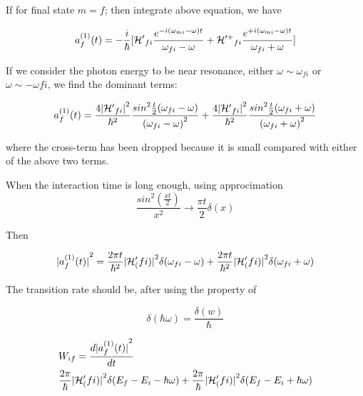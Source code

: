 If for final state $m=f$; then integrate above equation, we have

\begin{equation}
{a^{(1)}_{f}(t)}=-\frac{i}{\hbar}[{\mathcal{H}^\prime}_{fi}\frac{e^{-i(\omega_{mi}-\omega)t}}{\omega_{fi}-\omega}+{\mathcal{H}^{\prime+}}_{fi}\frac{e^{+i(\omega_{mi}-\omega)t}}{\omega_{fi}+\omega}]
\end{equation}

If we consider the photon energy to be near resonance, either $\omega\sim\omega_{fi}$ or $\omega\sim-\omega{fi}$, we find the dominant terms:

\begin{equation}
  {a^{(1)}_{f}(t)}=\frac{4{|{\mathcal{H}^\prime}_{fi}|}^2}{\hbar^2}\frac{{sin}^2\frac{t}{2}(\omega_{fi}-\omega)}{{(\omega_{fi}-\omega)}^2} +\frac{4{|{\mathcal{H}^\prime}_{fi}|}^2}{\hbar^2}\frac{{sin}^2\frac{t}{2}(\omega_{fi}+\omega)}{{(\omega_{fi}+\omega)}^2}
\end{equation}

where the cross-term has been dropped because it is small compared with either of the above two terms.

When the interaction time is long enough, using approcimation
\begin{equation}
  \frac{{sin}^2(\frac{xt}{2})}{x^2}\rightarrow \frac{\pi{t}}{2}\delta(x)
\end{equation}

Then

\begin{equation}
  {|a^{(1)}_f(t)|}^2= \frac{2\pi{t}}{\hbar^2}{|\mathcal{H}^\prime_(fi)|}^2\delta(\omega_{fi}-\omega)+\frac{2\pi{t}}{\hbar^2}{|\mathcal{H}^\prime_(fi)|}^2\delta(\omega_{fi}+\omega)
\end{equation}

The transition rate should be, after using the property of

\begin{equation}
  \delta(\hbar\omega)=\frac{\delta(w)}{\hbar}
\end{equation}

\begin{eqnarray}
\begin{aligned}
  & W_{if} = \frac{d{|a^{(1)}_f(t)|}^2}{dt} \\ 
  &  \frac{2\pi}{\hbar}{|\mathcal{H}^\prime_(fi)|}^2\delta(E_{f}-E_{i}-\hbar\omega)+\frac{2\pi}{\hbar}{|\mathcal{H}^\prime_(fi)|}^2\delta(E_{f}-E_{i}+\hbar\omega)
\end{aligned}
\end{eqnarray}

